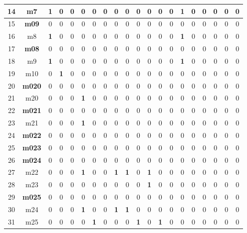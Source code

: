 \documentclass[a4paper,14pt]{extarticle}
\begin{document}
\begin{landscape}
\begin{table}[h!]
\begin{tabular}{|c||c|c|c|c|c|c|c|c|c|c|c|c||c|c|c|c|c|c|c|}
			14 & m7 & \textbf{1} & 0 & 0 & 0 & 0 & 0 & 0 & 0 & 0 & 0 & 0 & 0 & \textbf{1} & 0 & 0 & 0 & 0 & 0 \\ \hline
			15 & \textbf{m09} & 0 & 0 & 0 & 0 & 0 & 0 & 0 & 0 & 0 & 0 & 0 & 0 & 0 & 0 & 0 & 0 & 0 & 0 \\ \hline
			16 & m8 & \textbf{1} & 0 & 0 & 0 & 0 & 0 & 0 & 0 & 0 & 0 & 0 & 0 & \textbf{1} & 0 & 0 & 0 & 0 & 0 \\ \hline
			17 & \textbf{m08} & 0 & 0 & 0 & 0 & 0 & 0 & 0 & 0 & 0 & 0 & 0 & 0 & 0 & 0 & 0 & 0 & 0 & 0 \\ \hline
			18 & m9 & \textbf{1} & 0 & 0 & 0 & 0 & 0 & 0 & 0 & 0 & 0 & 0 & 0 & \textbf{1} & 0 & 0 & 0 & 0 & 0 \\ \hline
			19 & m10 & 0 & \textbf{1} & 0 & 0 & 0 & 0 & 0 & 0 & 0 & 0 & 0 & 0 & 0 & 0 & 0 & 0 & 0 & 0 \\ \hline
			20 & \textbf{m020} & 0 & 0 & 0 & 0 & 0 & 0 & 0 & 0 & 0 & 0 & 0 & 0 & 0 & 0 & 0 & 0 & 0 & 0 \\ \hline
			21 & m20 & 0 & 0 & 0 & \textbf{1} & 0 & 0 & 0 & 0 & 0 & 0 & 0 & 0 & 0 & 0 & 0 & 0 & 0 & 0 \\ \hline
			22 & \textbf{m021} & 0 & 0 & 0 & 0 & 0 & 0 & 0 & 0 & 0 & 0 & 0 & 0 & 0 & 0 & 0 & 0 & 0 & 0 \\ \hline
			23 & m21 & 0 & 0 & 0 & \textbf{1} & 0 & 0 & 0 & 0 & 0 & 0 & 0 & 0 & 0 & 0 & 0 & 0 & 0 & 0 \\ \hline
			24 & \textbf{m022} & 0 & 0 & 0 & 0 & 0 & 0 & 0 & 0 & 0 & 0 & 0 & 0 & 0 & 0 & 0 & 0 & 0 & 0 \\ \hline
			25 & \textbf{m023} & 0 & 0 & 0 & 0 & 0 & 0 & 0 & 0 & 0 & 0 & 0 & 0 & 0 & 0 & 0 & 0 & 0 & 0 \\ \hline
			26 & \textbf{m024} & 0 & 0 & 0 & 0 & 0 & 0 & 0 & 0 & 0 & 0 & 0 & 0 & 0 & 0 & 0 & 0 & 0 & 0 \\ \hline
			27 & m22 & 0 & 0 & 0 & \textbf{1} & 0 & 0 & \textbf{1} & \textbf{1} & 0 & \textbf{1} & 0 & 0 & 0 & 0 & 0 & 0 & 0 & 0 \\ \hline
			28 & m23 & 0 & 0 & 0 & 0 & 0 & 0 & 0 & 0 & 0 & \textbf{1} & 0 & 0 & 0 & 0 & 0 & 0 & 0 & 0 \\ \hline
			29 & \textbf{m025} & 0 & 0 & 0 & 0 & 0 & 0 & 0 & 0 & 0 & 0 & 0 & 0 & 0 & 0 & 0 & 0 & 0 & 0 \\ \hline
			30 & m24 & 0 & 0 & 0 & \textbf{1} & 0 & 0 & \textbf{1} & \textbf{1} & 0 & 0 & 0 & 0 & 0 & 0 & 0 & 0 & 0 & 0 \\ \hline
			31 & m25 & 0 & 0 & 0 & 0 & \textbf{1} & 0 & 0 & 0 & \textbf{1} & 0 & \textbf{1} & 0 & 0 & 0 & 0 & 0 & 0 & 0 \\ \hline

\end{tabular}
\end{table}
\end{landscape}
\end{document}
